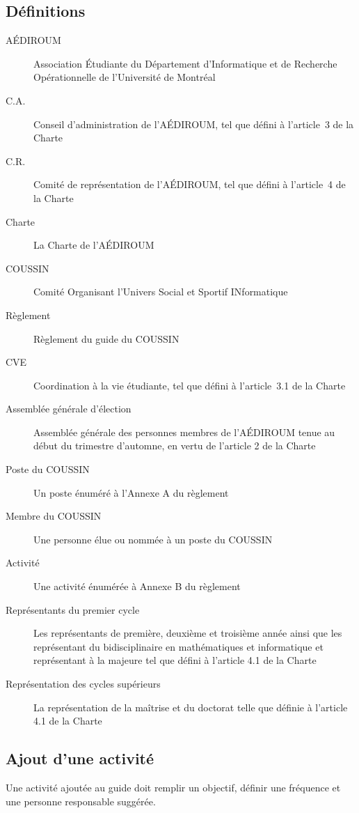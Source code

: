 \documentclass{aediroum}
\begin{document}
\subsection{Définitions}\label{sec:definitions}
\begin{description}
    \item[AÉDIROUM] Association Étudiante du Département d'Informatique et de Recherche Opérationnelle de l'Université de Montréal
    \item[C.A.] Conseil d’administration de l’AÉDIROUM, tel que défini à l’article~3 de la Charte
    \item[C.R.] Comité de représentation de l'AÉDIROUM, tel que défini à l'article~4 de la Charte
    \item[Charte] La Charte de l'AÉDIROUM
    \item[COUSSIN] Comité Organisant l'Univers Social et Sportif INformatique
    \item[Règlement] Règlement du guide du COUSSIN
    \item[CVE] Coordination à la vie étudiante, tel que défini à l'article~3.1 de la Charte
    \item[Assemblée générale d'élection] Assemblée générale des personnes membres de l'AÉDIROUM tenue au début du trimestre d'automne, en vertu de l'article 2 de la Charte
    \item[Poste du COUSSIN] Un poste énuméré à l'Annexe A du règlement
    \item[Membre du COUSSIN] Une personne élue ou nommée à un poste du COUSSIN
    \item[Activité] Une activité énumérée à Annexe B du règlement
    \item[Représentants du premier cycle] Les représentants de première, deuxième et troisième année ainsi que les représentant du bidisciplinaire en mathématiques et informatique et représentant à la majeure tel que défini à l'article 4.1 de la Charte
    \item[Représentation des cycles supérieurs] La représentation de la maîtrise et du doctorat telle que définie à l'article 4.1 de la Charte
\end{description}

\subsection{Ajout d'une activité}\label{sec:ajout-activite}
Une activité ajoutée au guide doit remplir un objectif, définir une fréquence et une personne responsable suggérée.
\end{document}
